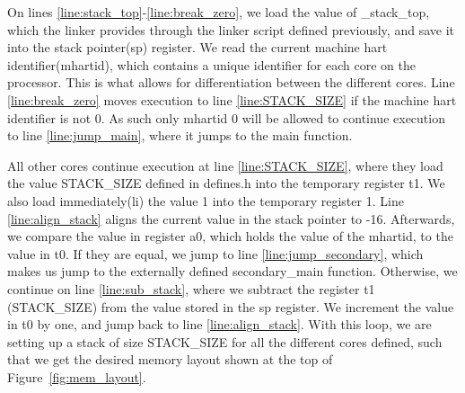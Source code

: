 On lines \ref{line:stack_top}-\ref{line:break_zero}, we load the value of
\_stack\_top, which the linker provides through the linker script defined
previously, and save it into the stack pointer(sp) register. We read the current
machine hart identifier(mhartid), which contains a unique identifier for each
core on the processor. This is what allows for differentiation between the
different cores. Line \ref{line:break_zero} moves execution to line
\ref{line:STACK_SIZE} if the machine hart identifier is not 0. As such only
mhartid 0 will be allowed to continue execution to line \ref{line:jump_main},
where it jumps to the main function.

All other cores continue execution at line \ref{line:STACK_SIZE}, where they
load the value STACK\_SIZE defined in defines.h into the temporary register t1.
We also load immediately(li) the value 1 into the temporary register 1. Line
\ref{line:align_stack} aligns the current value in the stack pointer to -16.
Afterwards, we compare the value in register a0, which holds the value of the
mhartid, to the value in t0. If they are equal, we jump to line
\ref{line:jump_secondary}, which makes us jump to the externally defined
secondary\_main function. Otherwise, we continue on line \ref{line:sub_stack},
where we subtract the register t1 (STACK\_SIZE) from the value stored in the sp
register. We increment the value in t0 by one, and jump back to line
\ref{line:align_stack}. With this loop, we are setting up a stack of size
STACK\_SIZE for all the different cores defined, such that we get the desired
memory layout shown at the top of Figure~\ref{fig:mem_layout}.



